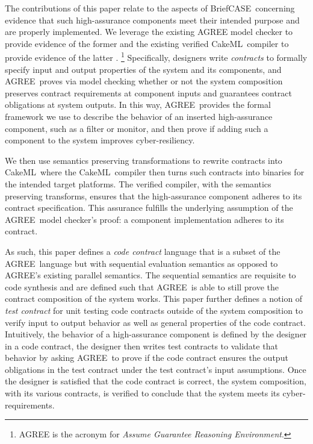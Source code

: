 \documentclass[global,twocolumn]{svjour}
\newcommand{\brfcs}{BriefCASE}
\newcommand{\agr}{AGREE}
\newcommand{\ckml}{CakeML}
\begin{document}
The contributions of this paper relate to the aspects of \brfcs\ concerning evidence that such high-assurance components meet their intended purpose and are properly implemented.
%
We leverage the existing {\agr} model checker to provide evidence of the former and the existing verified \ckml\ compiler to provide evidence of the latter \cite{agree2013,compositional-analysis-agree,nfm:agree,cakeml}.
%
\footnote{AGREE is the acronym for \emph{Assume Guarantee Reasoning Environment}.}
%
Specifically, designers write \emph{contracts} to formally specify input and output properties of the system and its components, and \agr\ proves via model checking whether or not the system composition preserves contract requirements at component inputs and guarantees contract obligations at system outputs.
%
In this way, \agr\ provides the formal framework we use to describe the behavior of an inserted high-assurance component, such as a filter or monitor, and then prove if adding such a component to the system improves cyber-resiliency.

We then use semantics preserving transformations to rewrite contracts into \ckml\ where the \ckml\ compiler then turns such contracts into binaries for the intended target platforms.
%
The verified compiler, with the semantics preserving transforms, ensures that the high-assurance component adheres to its contract specification.
%
This assurance fulfills the underlying assumption of the \agr\ model checker's proof: a component implementation adheres to its contract.

As such, this paper defines a \emph{code contract} language that is a subset of the \agr\ language but with sequential evaluation semantics as opposed to \agr's existing parallel semantics.
%
The sequential semantics are requisite to code synthesis and are defined such that \agr\ is able to still prove the contract composition of the system works.
%
This paper further defines a notion of \emph{test contract} for unit testing code contracts outside of the system composition to verify input to output behavior as well as general properties of the code contract.
%
Intuitively, the behavior of a high-assurance component is defined by the designer in a code contract, the designer then writes test contracts to validate that behavior by asking \agr\ to prove if the code contract ensures the output obligations in the test contract under the test contract's input assumptions.
%
Once the designer is satisfied that the code contract is correct, the system composition, with its various contracts, is verified to conclude that the system meets its cyber-requirements.
\end{document}
